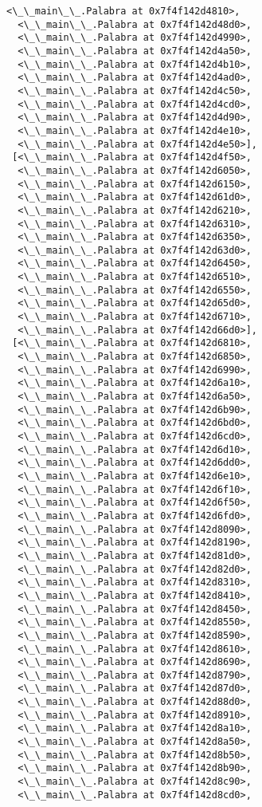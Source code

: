 \documentclass[12pt,a4paper,table]{article}
\begin{document}
\begin{tcolorbox}[breakable, size=fbox, boxrule=.5pt, pad at break*=1mm, opacityfill=0]
\begin{Verbatim}[commandchars=\\\{\}]
  <\_\_main\_\_.Palabra at 0x7f4f142d4810>,
  <\_\_main\_\_.Palabra at 0x7f4f142d48d0>,
  <\_\_main\_\_.Palabra at 0x7f4f142d4990>,
  <\_\_main\_\_.Palabra at 0x7f4f142d4a50>,
  <\_\_main\_\_.Palabra at 0x7f4f142d4b10>,
  <\_\_main\_\_.Palabra at 0x7f4f142d4ad0>,
  <\_\_main\_\_.Palabra at 0x7f4f142d4c50>,
  <\_\_main\_\_.Palabra at 0x7f4f142d4cd0>,
  <\_\_main\_\_.Palabra at 0x7f4f142d4d90>,
  <\_\_main\_\_.Palabra at 0x7f4f142d4e10>,
  <\_\_main\_\_.Palabra at 0x7f4f142d4e50>],
 [<\_\_main\_\_.Palabra at 0x7f4f142d4f50>,
  <\_\_main\_\_.Palabra at 0x7f4f142d6050>,
  <\_\_main\_\_.Palabra at 0x7f4f142d6150>,
  <\_\_main\_\_.Palabra at 0x7f4f142d61d0>,
  <\_\_main\_\_.Palabra at 0x7f4f142d6210>,
  <\_\_main\_\_.Palabra at 0x7f4f142d6310>,
  <\_\_main\_\_.Palabra at 0x7f4f142d6350>,
  <\_\_main\_\_.Palabra at 0x7f4f142d63d0>,
  <\_\_main\_\_.Palabra at 0x7f4f142d6450>,
  <\_\_main\_\_.Palabra at 0x7f4f142d6510>,
  <\_\_main\_\_.Palabra at 0x7f4f142d6550>,
  <\_\_main\_\_.Palabra at 0x7f4f142d65d0>,
  <\_\_main\_\_.Palabra at 0x7f4f142d6710>,
  <\_\_main\_\_.Palabra at 0x7f4f142d66d0>],
 [<\_\_main\_\_.Palabra at 0x7f4f142d6810>,
  <\_\_main\_\_.Palabra at 0x7f4f142d6850>,
  <\_\_main\_\_.Palabra at 0x7f4f142d6990>,
  <\_\_main\_\_.Palabra at 0x7f4f142d6a10>,
  <\_\_main\_\_.Palabra at 0x7f4f142d6a50>,
  <\_\_main\_\_.Palabra at 0x7f4f142d6b90>,
  <\_\_main\_\_.Palabra at 0x7f4f142d6bd0>,
  <\_\_main\_\_.Palabra at 0x7f4f142d6cd0>,
  <\_\_main\_\_.Palabra at 0x7f4f142d6d10>,
  <\_\_main\_\_.Palabra at 0x7f4f142d6dd0>,
  <\_\_main\_\_.Palabra at 0x7f4f142d6e10>,
  <\_\_main\_\_.Palabra at 0x7f4f142d6f10>,
  <\_\_main\_\_.Palabra at 0x7f4f142d6f50>,
  <\_\_main\_\_.Palabra at 0x7f4f142d6fd0>,
  <\_\_main\_\_.Palabra at 0x7f4f142d8090>,
  <\_\_main\_\_.Palabra at 0x7f4f142d8190>,
  <\_\_main\_\_.Palabra at 0x7f4f142d81d0>,
  <\_\_main\_\_.Palabra at 0x7f4f142d82d0>,
  <\_\_main\_\_.Palabra at 0x7f4f142d8310>,
  <\_\_main\_\_.Palabra at 0x7f4f142d8410>,
  <\_\_main\_\_.Palabra at 0x7f4f142d8450>,
  <\_\_main\_\_.Palabra at 0x7f4f142d8550>,
  <\_\_main\_\_.Palabra at 0x7f4f142d8590>,
  <\_\_main\_\_.Palabra at 0x7f4f142d8610>,
  <\_\_main\_\_.Palabra at 0x7f4f142d8690>,
  <\_\_main\_\_.Palabra at 0x7f4f142d8790>,
  <\_\_main\_\_.Palabra at 0x7f4f142d87d0>,
  <\_\_main\_\_.Palabra at 0x7f4f142d88d0>,
  <\_\_main\_\_.Palabra at 0x7f4f142d8910>,
  <\_\_main\_\_.Palabra at 0x7f4f142d8a10>,
  <\_\_main\_\_.Palabra at 0x7f4f142d8a50>,
  <\_\_main\_\_.Palabra at 0x7f4f142d8b50>,
  <\_\_main\_\_.Palabra at 0x7f4f142d8b90>,
  <\_\_main\_\_.Palabra at 0x7f4f142d8c90>,
  <\_\_main\_\_.Palabra at 0x7f4f142d8cd0>,

\end{Verbatim}
\end{tcolorbox}
\end{document}
